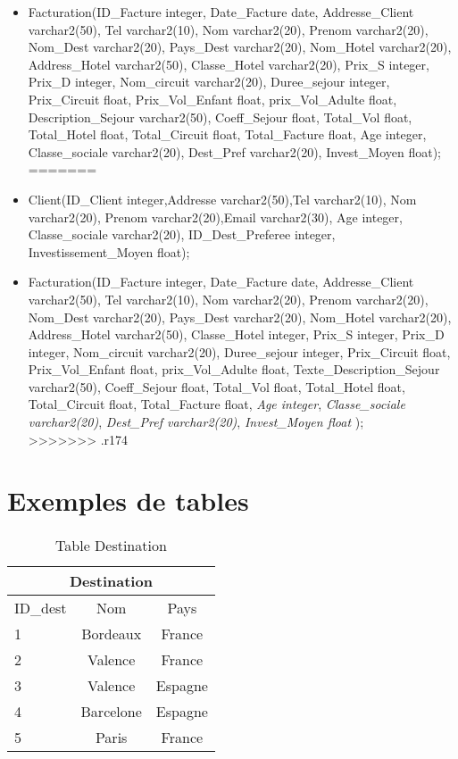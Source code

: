 \documentclass[10pt]{article}
\begin{document}
\begin{itemize}
\item Facturation(ID\_Facture integer, Date\_Facture date, Addresse\_Client varchar2(50), Tel varchar2(10), Nom varchar2(20), Prenom varchar2(20), Nom\_Dest varchar2(20), Pays\_Dest varchar2(20), Nom\_Hotel varchar2(20), Address\_Hotel varchar2(50), Classe\_Hotel varchar2(20), Prix\_S integer, Prix\_D integer, Nom\_circuit varchar2(20), Duree\_sejour integer, Prix\_Circuit float, Prix\_Vol\_Enfant float, prix\_Vol\_Adulte float, Description\_Sejour varchar2(50), Coeff\_Sejour float, Total\_Vol float, Total\_Hotel float,  Total\_Circuit float, Total\_Facture float, Age integer, Classe\_sociale varchar2(20), Dest\_Pref varchar2(20), Invest\_Moyen float);\\
=======
\item Client(ID\_Client integer,Addresse varchar2(50),Tel varchar2(10), Nom varchar2(20), Prenom varchar2(20),Email varchar2(30), Age integer, Classe\_sociale varchar2(20), ID\_Dest\_Preferee integer, Investissement\_Moyen float);\\

\item Facturation(ID\_Facture integer, Date\_Facture date, Addresse\_Client varchar2(50), Tel varchar2(10), Nom varchar2(20), Prenom varchar2(20), Nom\_Dest varchar2(20), Pays\_Dest varchar2(20), Nom\_Hotel varchar2(20), Address\_Hotel varchar2(50), Classe\_Hotel integer, Prix\_S integer, Prix\_D integer, Nom\_circuit varchar2(20), Duree\_sejour integer, Prix\_Circuit float, Prix\_Vol\_Enfant float, prix\_Vol\_Adulte float, Texte\_Description\_Sejour varchar2(50), Coeff\_Sejour float, Total\_Vol float, Total\_Hotel float,  Total\_Circuit float, Total\_Facture float, \textit{Age integer}, \textit{Classe\_sociale varchar2(20)}, \textit{Dest\_Pref varchar2(20)}, \textit{Invest\_Moyen float} );\\
>>>>>>> .r174
\end{itemize}

\section{Exemples de tables}


\begin{table}[h]
\begin{center}
\begin{tabular}{|l|c|c|}
\hline
\multicolumn{3}{|c|}{Destination}\\
\hline
ID\_dest& Nom & Pays \\
\hline
1 & Bordeaux& France\\
\hline
2 & Valence& France\\
\hline
3 & Valence& Espagne\\
\hline
4 & Barcelone& Espagne\\
\hline
5 & Paris& France\\
\hline
\end{tabular}
\end{center}
\caption{Table Destination}
\end{table}
\end{document}
